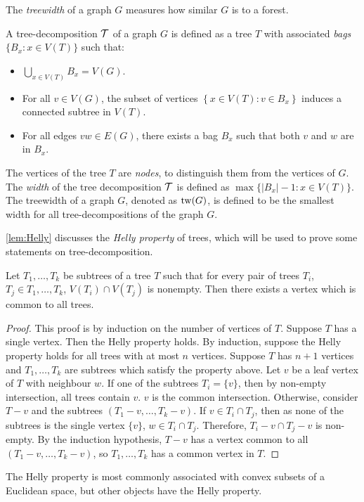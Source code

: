 The \textit{treewidth} of a graph \(G\) measures how similar $G$ is to a forest.
\begin{definition}\label{def:tree-decomposition}
	A tree-decomposition \(\mathcal{T}\) of a graph \(G\) is defined as a tree \(T\) with associated \textit{bags} \(\lbrace B_x : x \in V(T) \rbrace\) such that:
	\begin{itemize}
		\item $\bigcup_{x \in V(T)} B_x = V(G)$.
		\item For all \(v \in V(G)\), the subset of vertices \(\left\lbrace x \in V(T): v \in B_x \right\rbrace\) induces a connected subtree in \(V(T)\).
		\item For all edges \(vw \in E(G)\), there exists a bag \(B_x\) such that both \(v\) and \(w\) are in \(B_x\).
	\end{itemize}
\end{definition}
The vertices of the tree \(T\) are \textit{nodes}, to distinguish them from the vertices of $G$. 
The \textit{width} of the tree decomposition \(\mathcal{T}\) is defined as \(\max \lbrace |B_x| - 1 : x \in V(T) \rbrace\).
The treewidth of a graph \(G\), denoted as \(\operatorname{tw}(G)\), is defined to be the smallest width for all tree-decompositions of the graph \(G\). 

\cref{lem:Helly} discusses the \textit{Helly property} of trees, which will be used to prove some statements on tree-decomposition. 

\begin{lemma}\label{lem:Helly}
	Let \(T_1, \ldots, T_k\) be subtrees of a tree \(T\) such that for every pair of trees $T_i$, $T_j \in T_1, \ldots, T_k$, $V(T_i) \cap V(T_j)$ is nonempty. Then there exists a vertex which is common to all trees.
\end{lemma}
\begin{proof}
	This proof is by induction on the number of vertices of $T$. Suppose $T$ has a single vertex. Then the Helly property holds. By induction, suppose the Helly property holds for all trees with at most $n$ vertices. Suppose $T$ has $n + 1$ vertices and \(T_1, \ldots, T_k\) are subtrees which satisfy the property above. Let $v$ be a leaf vertex of $T$ with neighbour $w$. If one of the subtrees $T_i = \{v\}$, then by non-empty intersection, all trees contain $v$. $v$ is the common intersection. Otherwise, consider $T - v$ and the subtrees $(T_1 - v, \ldots, T_k - v)$. If $v \in T_i \cap T_j$, then as none of the subtrees is the single vertex $\{v\}$, $w \in T_i \cap T_j$. Therefore, $T_i - v \cap T_j - v$ is non-empty. By the induction hypothesis, $T - v$ has a vertex common to all $(T_1 - v, \ldots, T_k - v)$, so \(T_1, \ldots, T_k\) has a common vertex in $T$. 
\end{proof}
The Helly property is most commonly associated with convex subsets of a Euclidean space, but other objects have the Helly property. 


